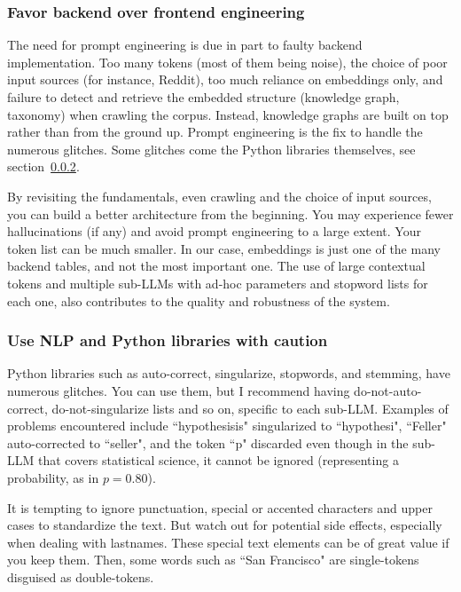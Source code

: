 \documentclass[10pt]{article}
\begin{document}
{%

\subsubsection{Favor backend over frontend engineering}
The need for \textcolor{index}{prompt engineering} is due in part to faulty backend implementation. Too many tokens (most of them being noise), the choice of poor input sources (for instance, Reddit), too much reliance on embeddings only, and failure to detect and retrieve the embedded structure (knowledge graph, taxonomy) when crawling the corpus. Instead, knowledge graphs are built on top rather than from the ground up. Prompt engineering is the fix to handle the numerous glitches. Some glitches come the Python libraries themselves, see section~\ref{c2sewaop}.

By revisiting the fundamentals, even crawling and the choice of input sources, you can build a better architecture from the beginning. You may experience fewer hallucinations (if any) and avoid prompt engineering to a large extent. Your token list can be much smaller. In our case, embeddings is just one of the many backend tables, and not the most important one. The use of large contextual tokens and multiple sub-LLMs with ad-hoc parameters and stopword lists for each one, also contributes to the quality and robustness of the system.

\subsubsection{Use NLP and Python libraries with caution} \label{c2sewaop}
Python libraries such as auto-correct, singularize, stopwords, and stemming, have numerous glitches. You can use them, but I recommend having do-not-auto-correct, do-not-singularize lists and so on, specific to each sub-LLM. Examples of problems encountered include ``hypothesisis" singularized to ``hypothesi", ``Feller" auto-corrected to ``seller", and the token ``p" discarded
 even though in the sub-LLM that covers statistical science, it cannot be ignored (representing a probability, as in $p=0.80$).  

It is tempting to ignore punctuation, special or accented characters and upper cases to standardize the text. But watch out for potential side effects, especially when dealing with lastnames. These special text elements can be of great value if you keep them. Then, some words such as ``San Francisco" are single-tokens disguised as double-tokens.

}
\end{document}
